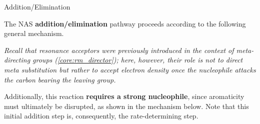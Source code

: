     \begin{core}[label=core:add_elim]{Addition/Elimination}

      The NAS \textbf{addition/elimination} pathway proceeds according to the following general mechanism.


      \textit{Recall that resonance acceptors were previously introduced in the context of meta-directing groups (\autoref{core:rm_director}); here, however, their role is not to direct meta substitution but rather to accept electron density once the nucleophile attacks the carbon bearing the leaving group.}

      Additionally, this reaction \textbf{requires a strong nucleophile}, since aromaticity must ultimately be disrupted, as shown in the mechanism below. Note that this initial addition step is, consequently, the rate-determining step.


\end{core}
